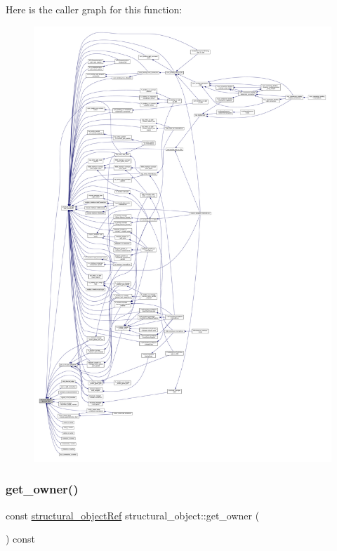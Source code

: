 Here is the caller graph for this function\+:
\nopagebreak
\begin{figure}[H]
\begin{center}
\leavevmode
\includegraphics[width=350pt]{d8/da3/classstructural__object_a36c541b52425c4de8fa45d79285a97e7_icgraph}
\end{center}
\end{figure}
\mbox{\label{classstructural__object_a0a86ebdcc46ff4f74712a0d755bcad9d}} 
\subsubsection{\texorpdfstring{get\+\_\+owner()}{get\_owner()}}
{\footnotesize\ttfamily const \hyperlink{structural__objects_8hpp_a8ea5f8cc50ab8f4c31e2751074ff60b2}{structural\+\_\+object\+Ref} structural\+\_\+object\+::get\+\_\+owner (\begin{DoxyParamCaption}{ }\end{DoxyParamCaption}) const}



